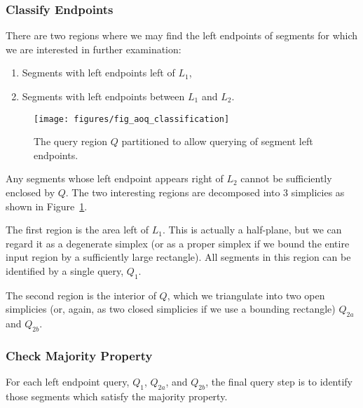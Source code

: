 \subsubsection{Classify Endpoints}
\label{:slabs:one:details:classify}

There are two regions where we may find the left endpoints of segments for which we are interested in further examination:
\begin{enumerate}
 \item Segments with left endpoints left of $L_1$,
 \item Segments with left endpoints between $L_1$ and $L_2$.
\end{enumerate}

\begin{figure}[t]
\begin{center}
  \texttt{[image: figures/fig\_aoq\_classification]}
  \caption{The query region $Q$ partitioned to allow querying of segment left endpoints.}
  \label{fig:slabs:one:classification}
\end{center}
\end{figure}

Any segments whose left endpoint appears right of $L_2$ cannot be sufficiently enclosed by $Q$. The two interesting regions are decomposed into 3 simplicies as shown in Figure~\ref{fig:slabs:one:classification}.

The first region is the area left of $L_1$. This is actually a half-plane, but we can regard it as a degenerate simplex (or as a proper simplex if we bound the entire input region by a sufficiently large rectangle). All segments in this region can be identified by a single query, $Q_1$.

The second region is the interior of $Q$, which we triangulate into two open simplicies (or, again, as two closed simplicies if we use a bounding rectangle) $Q_{2a}$ and $Q_{2b}$.

\subsubsection{Check Majority Property}
\label{:slabs:one:details:majority}


For each left endpoint query, $Q_1$, $Q_{2a}$, and $Q_{2b}$, the final query step is to identify those segments which satisfy the majority property.



